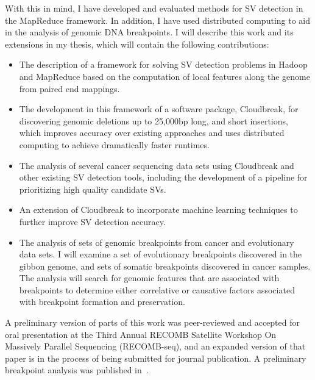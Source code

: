 With this in mind, I have developed and evaluated methods for SV detection in the MapReduce framework. In addition, I have used distributed computing to aid in the analysis of genomic DNA breakpoints. I will describe this work and its extensions in my thesis, which will contain the following contributions:

\begin{itemize}
 \item The description of a framework for solving SV detection problems in Hadoop and MapReduce based on the computation of local features along the genome from paired end mappings.
 \item The development in this framework of a software package, Cloudbreak, for discovering genomic deletions up to 25,000bp long, and short insertions, which improves accuracy over existing approaches and uses distributed computing to achieve dramatically faster runtimes.
 \item The analysis of several cancer sequencing data sets using Cloudbreak and other existing SV detection tools, including the development of a pipeline for prioritizing high quality candidate SVs.
 \item An extension of Cloudbreak to incorporate machine learning techniques to further improve SV detection accuracy.
 \item The analysis of sets of genomic breakpoints from cancer and evolutionary data sets. I will examine a set of evolutionary breakpoints discovered in the gibbon genome, and sets of somatic breakpoints discovered in cancer samples. The analysis will search for genomic features that are associated with breakpoints to determine either correlative or causative factors associated with breakpoint formation and preservation.
\end{itemize}

A preliminary version of parts of this work was peer-reviewed and accepted for oral presentation at the Third Annual RECOMB Satellite Workshop On Massively Parallel Sequencing (RECOMB-seq), and an expanded version of that paper is in the process of being submitted for journal publication. A preliminary breakpoint analysis was published in~\cite{Capozzi:2012bb}.
